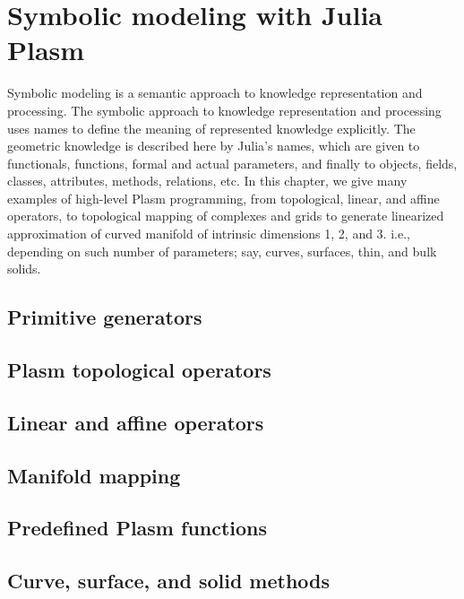
\chapter{Symbolic modeling with Julia Plasm}
\label{chapt:5}

Symbolic modeling is a semantic approach to knowledge representation and processing. The symbolic approach to knowledge representation and processing uses names to define the meaning of represented knowledge explicitly. The geometric knowledge is described here by Julia's names, which are given to functionals, functions, formal and actual parameters, and finally to objects, fields, classes, attributes, methods, relations, etc. In this chapter, we give many examples of high-level Plasm programming, from topological, linear, and affine operators, to topological mapping of complexes and grids to generate linearized approximation of curved manifold of intrinsic dimensions 1, 2, and 3. i.e., depending on such number of parameters; say, curves, surfaces, thin, and bulk solids.

\section{ Primitive generators}\label{sect:5-1}


\section{ Plasm topological operators}\label{sect:5-2}


\section{ Linear and affine operators}\label{sect:5-3}


\section{ Manifold mapping}\label{sect:5-4}


\section{ Predefined Plasm functions}\label{sect:5-5}


\section{ Curve, surface, and solid methods}\label{sect:5-6}


